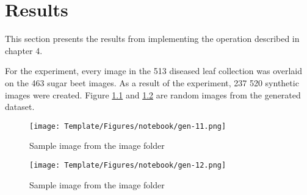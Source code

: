 
\chapter{Results} %

\label{Chapter4} %
This section presents the results from implementing the operation described in chapter 4.

For the experiment, every image in the 513 diseased leaf collection was overlaid on the 463 sugar beet images. As a result of the experiment, 237 520 synthetic images were created. Figure \ref{fig:my_gen_6} and \ref{fig:my_gen_7} are random images from the generated dataset.

\begin{figure}[!htb]
    \centering
    \texttt{[image: Template/Figures/notebook/gen-11.png]}
    \caption{Sample image from the image folder}
    \label{fig:my_gen_6}
\end{figure} 

\begin{figure}[!htb]
    \centering
    \texttt{[image: Template/Figures/notebook/gen-12.png]}
    \caption{Sample image from the image folder}
    \label{fig:my_gen_7}
\end{figure} 